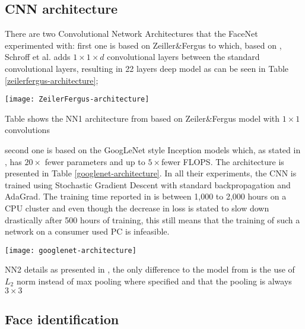 \subsection{CNN architecture}
There are two Convolutional Network Architectures that the FaceNet experimented with: first one is based on Zeiller\&Fergus \cite{ZeilerF13} to which, based on \cite{LinCY13}, Schroff et al. adds $1 \times 1 \times d$ convolutional layers between the standard convolutional layers, resulting in 22 layers deep model as can be seen in Table \ref{zeilerfergus-architecture};
\begin{table}[h]
	\begin{center}
		\texttt{[image: ZeilerFergus-architecture]}
	\end{center}
	\caption[Zeiler\&Fergus architecture used in FaceNet]{Table shows the NN1 architecture from \cite{SchroffKP15} based on Zeiler\&Fergus model with $1 \times 1$ convolutions}
	\label{zeilerfergus-architecture}
\end{table}
 second one is based on the GoogLeNet style Inception models \cite{DSzegedyLJSRAEVR14} which, as stated in \cite{SchroffKP15}, has $20\times$ fewer parameters and up to $5\times$fewer FLOPS. The architecture is presented in Table \ref{googlenet-architecture}. In all their experiments, the CNN is trained using Stochastic Gradient Descent with standard backpropagation and AdaGrad. The training time reported in \cite{SchroffKP15} is between 1,000 to 2,000 hours on a CPU cluster and even though the decrease in loss is stated to slow down drastically after 500 hours of training, this still means that the training of such a network on a consumer used PC is infeasible. 
 \begin{table}[h]
 	\begin{center}
 		\texttt{[image: googlenet-architecture]}
 	\end{center}
 	\caption[NN2 Inception CNN architecture]{NN2 details as presented in \cite{SchroffKP15}, the only difference to the model from \cite{DSzegedyLJSRAEVR14} is the use of $L_2$ norm instead of max pooling where specified and that the pooling is always $3\times3$}
 	\label{googlenet-architecture}
 \end{table}
\subsection{Face identification} \label{face_recognition}

